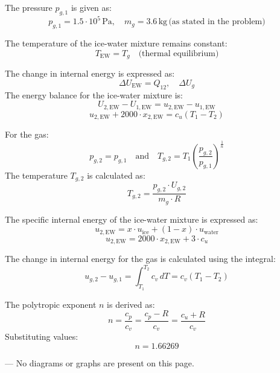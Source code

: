 The pressure \( p_{g,1} \) is given as:  
\[
p_{g,1} = 1.5 \cdot 10^5 \, \text{Pa}, \quad m_g = 3.6 \, \text{kg} \, \text{(as stated in the problem)}
\]  

The temperature of the ice-water mixture remains constant:  
\[
T_{\text{EW}} = T_g \quad \text{(thermal equilibrium)}
\]  

The change in internal energy is expressed as:  
\[
\Delta U_{\text{EW}} = Q_{12}, \quad \Delta U_g
\]  
The energy balance for the ice-water mixture is:  
\[
U_{2,\text{EW}} - U_{1,\text{EW}} = u_{2,\text{EW}} - u_{1,\text{EW}}
\]  
\[
u_{2,\text{EW}} + 2000 \cdot x_{2,\text{EW}} = c_u (T_1 - T_2)
\]  

For the gas:  
\[
p_{g,2} = p_{g,1} \quad \text{and} \quad T_{g,2} = T_1 \left(\frac{p_{g,2}}{p_{g,1}}\right)^{\frac{1}{n}}
\]  
The temperature \( T_{g,2} \) is calculated as:  
\[
T_{g,2} = \frac{p_{g,2} \cdot U_{g,2}}{m_g \cdot R}
\]  

The specific internal energy of the ice-water mixture is expressed as:  
\[
u_{2,\text{EW}} = x \cdot u_{\text{ice}} + (1-x) \cdot u_{\text{water}}
\]  
\[
u_{2,\text{EW}} = 2000 \cdot x_{2,\text{EW}} + 3 \cdot c_u
\]  

The change in internal energy for the gas is calculated using the integral:  
\[
u_{g,2} - u_{g,1} = \int_{T_1}^{T_2} c_v \, dT = c_v (T_1 - T_2)
\]  

The polytropic exponent \( n \) is derived as:  
\[
n = \frac{c_p}{c_v} = \frac{c_p - R}{c_v} = \frac{c_u + R}{c_v}
\]  
Substituting values:  
\[
n = 1.66269
\]  

---  
No diagrams or graphs are present on this page.